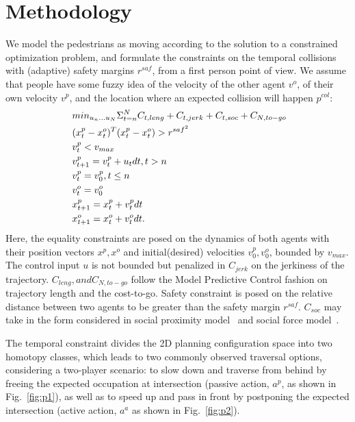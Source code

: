 \documentclass[conference]{IEEEtran}
\begin{document}
\section{Methodology}
\vspace{-0.1em}
We model the pedestrians as moving according to the solution to a constrained optimization 
problem, and formulate the constraints on the temporal collisions with 
(adaptive) safety margins $r^{saf}$, from a first person point of view. We assume that 
people have some fuzzy idea of the velocity of the other agent $v^o$, of their 
own velocity $v^p$, and the location where an expected collision will happen $p^{col}$:
\begin{equation}~\label{eq:receding_control}
  \begin{aligned}
    &min_{u_n \dots u_N} \Sigma^N_{t=n} \small{C_{t,leng} + C_{t,jerk} + C_{t,soc}} + C_{N,to-go}\\
    & (x^p_t-x^o_t)^T(x^p_t-x^o_t) > r^{{saf}^2}\\
    & v^p_t < v_{max}\\
    & v^p_{t+1} = v^p_t + u_t \scriptsize{d}t, t>n\\
    & v^p_t = v^p_0, t \leq n\\
    & v^o_t = v^o_0\\
    & x^p_{t+1} = x^p_t + v^p_t \scriptsize{d}t\\
    & x^o_{t+1} = x^o_t + v^o_t \scriptsize{d}t.
 \end{aligned}
\end{equation}
Here, the equality constraints are posed on the dynamics of both agents with 
their position vectors $x^p, x^o$ and initial(desired) velocities 
$v^p_0, v^o_0$, bounded by $v_{max}$. The control input $u$ is not bounded but 
penalized in $C_{jerk}$ on the jerkiness of the trajectory. 
$C_{leng}, and C_{N,to-go}$ follow the Model Predictive Control fashion on 
trajectory length and the cost-to-go. Safety constraint is posed on the 
relative distance between two agents to be greater than the safety margin 
$r^{saf}$. $C_{soc}$ may take in the form considered in social 
proximity model~\cite{kruse2012legible} and social force model~\cite{helbing1995social}.

The temporal constraint divides the 2D planning configuration space into two 
homotopy classes, which leads to two commonly observed traversal options, 
considering a two-player scenario: to slow down and traverse from behind by 
freeing the expected occupation at intersection (passive action, $a^{p}$, as 
shown in Fig.~\ref{fig:p1}), as well as to speed up and pass in front by postponing 
the expected intersection (active action, $a^a$ as shown in Fig.~\ref{fig:p2}).
\end{document}
